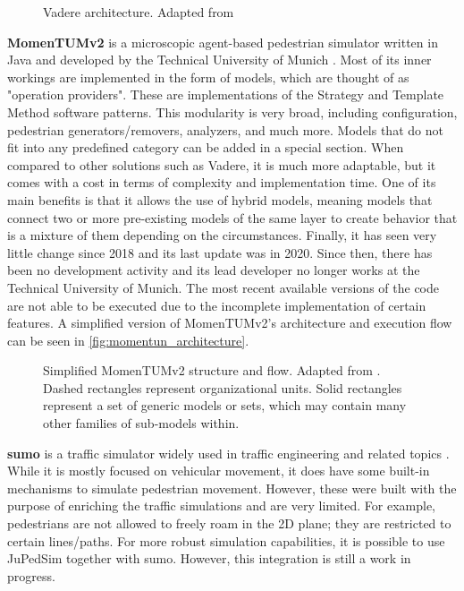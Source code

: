 \documentclass[twoside, 11pt]{article}
\begin{document}
\begin{figure}[h]
  \centering
  
  \caption[Vadere architecture]{Vadere architecture. Adapted from \cite{seitzSuperpositionPrincipleConceptual2016}}
  \label{fig:vadere_architecture}
\end{figure}

\textbf{MomenTUMv2} is a microscopic agent-based pedestrian simulator written in Java and developed by the Technical University of Munich \cite{kielarMomenTUMv2ModularExtensible2016}. Most of its inner workings are implemented in the form of models, which are thought of as "operation providers". These are implementations of the Strategy and Template Method software patterns. This modularity is very broad, including configuration, pedestrian generators/removers, analyzers, and much more. Models that do not fit into any predefined category can be added in a special section. When compared to other solutions such as Vadere, it is much more adaptable, but it comes with a cost in terms of complexity and implementation time. One of its main benefits is that it allows the use of hybrid models, meaning models that connect two or more pre-existing models of the same layer to create behavior that is a mixture of them depending on the circumstances. Finally, it has seen very little change since 2018 and its last update was in 2020. Since then, there has been no development activity and its lead developer no longer works at the Technical University of Munich. The most recent available versions of the code are not able to be executed due to the incomplete implementation of certain features. A simplified version of MomenTUMv2's architecture and execution flow can be seen in \autoref{fig:momentun_architecture}.

\begin{figure}[h]
  \centering
  
  \caption[Simplified MomenTUMv2 structure and flow]{Simplified MomenTUMv2 structure and flow. Adapted from \cite{kielarMomenTUMv2ModularExtensible2016}. Dashed rectangles represent organizational units. Solid rectangles represent a set of generic models or sets, which may contain many other families of sub-models within.}
  \label{fig:momentun_architecture}
\end{figure}

\textbf{\gls{sumo}} is a traffic simulator widely used in traffic engineering and related topics \cite{SUMO2018}. While it is mostly focused on vehicular movement, it does have some built-in mechanisms to simulate pedestrian movement. However, these were built with the purpose of enriching the traffic simulations and are very limited. For example, pedestrians are not allowed to freely roam in the 2D plane; they are restricted to certain lines/paths. For more robust simulation capabilities, it is possible to use JuPedSim together with \gls{sumo}. However, this integration is still a work in progress.
\end{document}

